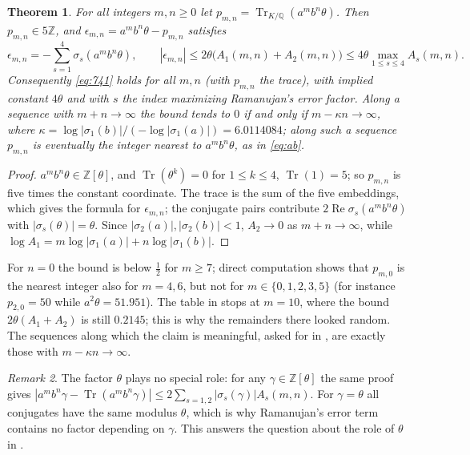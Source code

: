 \documentclass[11pt]{article}
\newtheorem{theorem}{Theorem}
\theoremstyle{remark}
\newtheorem{remark}[theorem]{Remark}
\newcommand{\Tr}{\operatorname{Tr}}
\newcommand{\Q}{\mathbb{Q}}
\newcommand{\Z}{\mathbb{Z}}
\begin{document}
\begin{theorem}\label{thm:main}
For all integers $m,n\ge0$ let $p_{m,n}=\Tr_{K/\Q}(a^mb^n\theta)$. Then $p_{m,n}\in5\Z$, and $\epsilon_{m,n}=a^mb^n\theta-p_{m,n}$ satisfies
\[
\epsilon_{m,n}=-\sum_{s=1}^4\sigma_s(a^mb^n\theta),\qquad |\epsilon_{m,n}|\le2\theta\bigl(A_1(m,n)+A_2(m,n)\bigr)\le4\theta\max_{1\le s\le4}A_s(m,n).
\]
Consequently \eqref{eq:741} holds for all $m,n$ (with $p_{m,n}$ the trace), with implied constant $4\theta$ and with $s$ the index maximizing Ramanujan's
error factor. Along a sequence with $m+n\to\infty$ the bound tends to $0$ if and only if $m-\kappa n\to\infty$, where
$\kappa=\log|\sigma_1(b)|/(-\log|\sigma_1(a)|)=6.0114084$; along such a sequence $p_{m,n}$ is eventually the integer nearest to
$a^mb^n\theta$, as in \eqref{eq:ab}.
\end{theorem}

\begin{proof}
$a^mb^n\theta\in\Z[\theta]$, and $\Tr(\theta^k)=0$ for $1\le k\le4$, $\Tr(1)=5$; so $p_{m,n}$ is five times the constant coordinate.
The trace is the sum of the five embeddings, which gives the formula for $\epsilon_{m,n}$; the conjugate pairs contribute
$2\operatorname{Re}\sigma_s(a^mb^n\theta)$ with $|\sigma_s(\theta)|=\theta$. Since $|\sigma_2(a)|,|\sigma_2(b)|<1$, $A_2\to0$ as
$m+n\to\infty$, while $\log A_1=m\log|\sigma_1(a)|+n\log|\sigma_1(b)|$.
\end{proof}

For $n=0$ the bound is below $\tfrac12$ for $m\ge7$; direct computation shows that $p_{m,0}$ is the nearest integer also for $m=4,6$,
but not for $m\in\{0,1,2,3,5\}$ (for instance $p_{2,0}=50$ while $a^2\theta=51.951$). The table in \cite[p.~181]{AB4} stops at $m=10$,
where the bound $2\theta(A_1+A_2)$ is still $0.2145$; this is why the remainders there looked random. The sequences along which the
claim is meaningful, asked for in \cite[p.~180]{AB4}, are exactly those with $m-\kappa n\to\infty$.

\begin{remark}\label{rem:theta}
The factor $\theta$ plays no special role: for any $\gamma\in\Z[\theta]$ the same proof gives
$|a^mb^n\gamma-\Tr(a^mb^n\gamma)|\le2\sum_{s=1,2}|\sigma_s(\gamma)|A_s(m,n)$. For $\gamma=\theta$ all conjugates have the same
modulus $\theta$, which is why Ramanujan's error term contains no factor depending on $\gamma$. This answers the question about
the role of $\theta$ in \cite[p.~180]{AB4}.
\end{remark}
\end{document}
